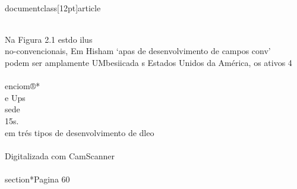 \\documentclass[12pt]{article}
\begin{document}
\\
Na Figura 2.1 estdo ilus\\
no-convencionais, Em Hisham ‘apas de desenvolvimento de campos conv’\\
podem ser amplamente UMbesiicada s Estados Unidos da América, os ativos 4\\
\\
enciom®*\\
e Ups\\
sede\\
15s.\\
em trés tipos de desenvolvimento de dleo\\
\\
Digitalizada com CamScanner\\

\\section*{Pagina 60}
\end{document}
